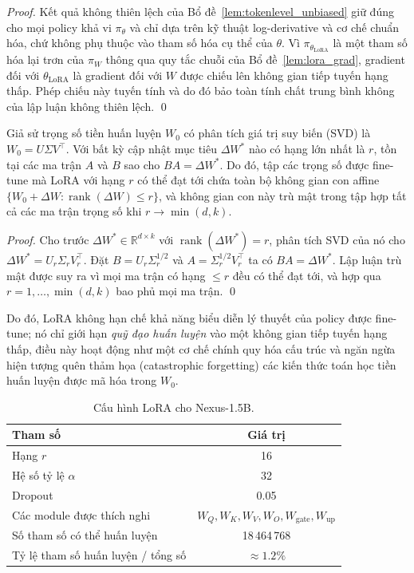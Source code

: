 \documentclass[11pt,a4paper]{article}
\begin{document}
\begin{proof}
Kết quả không thiên lệch của Bổ đề~\ref{lem:tokenlevel_unbiased} giữ đúng cho mọi
policy khả vi \(\pi_\theta\) và chỉ dựa trên kỹ thuật log-derivative
và cơ chế chuẩn hóa, chứ không phụ thuộc vào tham số hóa cụ thể của \(\theta\).
Vì \(\pi_{\theta_{\text{LoRA}}}\) là một tham số hóa lại trơn của
\(\pi_{W}\) thông qua quy tắc chuỗi của Bổ đề~\ref{lem:lora_grad}, gradient đối với
\(\theta_{\text{LoRA}}\) là gradient đối với \(W\) được chiếu
lên không gian tiếp tuyến hạng thấp. Phép chiếu này tuyến tính và do đó bảo toàn
tính chất trung bình không của lập luận không thiên lệch. \qed
\end{proof}

\begin{lemma}\label{lem:lora_rank}
Giả sử trọng số tiền huấn luyện \(W_0\) có phân tích giá trị suy biến (SVD) là
\(W_0 = U\Sigma V^\top\). Với bất kỳ cập nhật mục tiêu \(\Delta W^*\) nào có hạng lớn nhất là \(r\),
tồn tại các ma trận \(A\) và \(B\) sao cho \(BA = \Delta W^*\). Do đó, tập
các trọng số được fine-tune mà LoRA với hạng \(r\) có thể đạt tới chứa toàn bộ không gian con affine
\(\{W_0 + \Delta W : \operatorname{rank}(\Delta W) \le r\}\), và không gian con
này trù mật trong tập hợp tất cả các ma trận trọng số khi \(r \to \min(d,k)\).
\end{lemma}

\begin{proof}
Cho trước \(\Delta W^* \in \mathbb{R}^{d\times k}\) với \(\operatorname{rank}(\Delta W^*)=r\),
phân tích SVD của nó cho \(\Delta W^* = U_r \Sigma_r V_r^\top\). Đặt
\(B = U_r \Sigma_r^{1/2}\) và \(A = \Sigma_r^{1/2} V_r^\top\) ta có
\(BA = \Delta W^*\). Lập luận trù mật được suy ra vì mọi ma trận có hạng
\(\le r\) đều có thể đạt tới, và hợp qua \(r=1,\ldots,\min(d,k)\) bao phủ mọi
ma trận. \qed
\end{proof}

Do đó, LoRA không hạn chế khả năng biểu diễn lý thuyết của policy được
fine-tune; nó chỉ giới hạn \emph{quỹ đạo huấn luyện} vào một không gian tiếp tuyến hạng thấp,
điều này hoạt động như một cơ chế chính quy hóa cấu trúc và ngăn ngừa hiện tượng quên thảm họa (catastrophic forgetting) các
kiến thức toán học tiền huấn luyện được mã hóa trong \(W_0\).

\begin{table}[h]
\centering
\caption{Cấu hình LoRA cho Nexus-1.5B.}
\label{tab:lora}
\begin{tabular}{lc}
\toprule
Tham số & Giá trị \\
\midrule
Hạng \(r\) & 16 \\
Hệ số tỷ lệ \(\alpha\) & 32 \\
Dropout & 0.05 \\
Các module được thích nghi & \(W_Q, W_K, W_V, W_O, W_{\text{gate}}, W_{\text{up}}\) \\
Số tham số có thể huấn luyện & 18\,464\,768 \\
Tỷ lệ tham số huấn luyện / tổng số & \(\approx 1.2\%\) \\
\bottomrule
\end{tabular}
\end{table}
\end{document}
